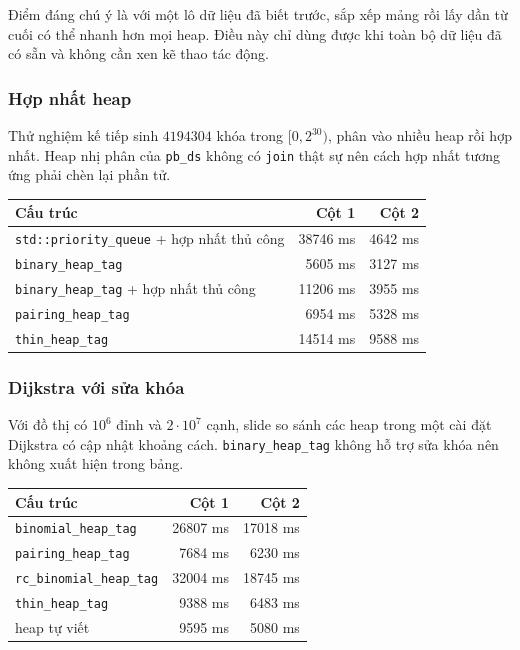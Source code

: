 \documentclass[11pt]{article}
\begin{document}
Điểm đáng chú ý là với một lô dữ liệu đã biết trước, sắp xếp mảng rồi lấy dần
từ cuối có thể nhanh hơn mọi heap. Điều này chỉ dùng được khi toàn bộ dữ liệu
đã có sẵn và không cần xen kẽ thao tác động.

\subsubsection{Hợp nhất heap}

Thử nghiệm kế tiếp sinh $4194304$ khóa trong $[0,2^{30})$, phân vào nhiều heap
rồi hợp nhất. Heap nhị phân của \texttt{pb\_ds} không có \texttt{join} thật sự
nên cách hợp nhất tương ứng phải chèn lại phần tử.

\begin{center}
\small
\begin{tabular}{|l|r|r|}
\hline
Cấu trúc & Cột 1 & Cột 2 \\
\hline
\texttt{std::priority\_queue} + hợp nhất thủ công & 38746 ms & 4642 ms \\
\texttt{binary\_heap\_tag} & 5605 ms & 3127 ms \\
\texttt{binary\_heap\_tag} + hợp nhất thủ công & 11206 ms & 3955 ms \\
\texttt{pairing\_heap\_tag} & 6954 ms & 5328 ms \\
\texttt{thin\_heap\_tag} & 14514 ms & 9588 ms \\
\hline
\end{tabular}
\end{center}

\subsubsection{Dijkstra với sửa khóa}

Với đồ thị có $10^6$ đỉnh và $2\cdot 10^7$ cạnh, slide so sánh các heap trong
một cài đặt Dijkstra có cập nhật khoảng cách. \texttt{binary\_heap\_tag} không
hỗ trợ sửa khóa nên không xuất hiện trong bảng.

\begin{center}
\small
\begin{tabular}{|l|r|r|}
\hline
Cấu trúc & Cột 1 & Cột 2 \\
\hline
\texttt{binomial\_heap\_tag} & 26807 ms & 17018 ms \\
\texttt{pairing\_heap\_tag} & 7684 ms & 6230 ms \\
\texttt{rc\_binomial\_heap\_tag} & 32004 ms & 18745 ms \\
\texttt{thin\_heap\_tag} & 9388 ms & 6483 ms \\
heap tự viết & 9595 ms & 5080 ms \\
\hline
\end{tabular}
\end{center}
\end{document}
